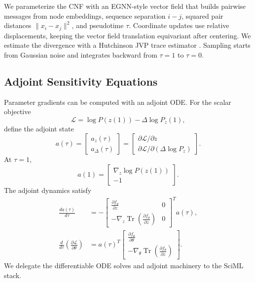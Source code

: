 \documentclass[reprint,amsmath,amssymb,aps,pra,10pt]{revtex4-2}
\begin{document}
We parameterize the CNF with an EGNN-style vector field that builds pairwise messages from node embeddings, sequence separation $i-j$, squared pair distances $\|x_i-x_j\|^2$, and pseudotime $\tau$.
Coordinate updates use relative displacements, keeping the vector field translation equivariant after centering.
We estimate the divergence with a Hutchinson JVP trace estimator \cite{hutchinson1989,grathwohl2018}.
Sampling starts from Gaussian noise and integrates backward from $\tau=1$ to $\tau=0$.

\subsection*{Adjoint Sensitivity Equations}

Parameter gradients can be computed with an adjoint ODE.
For the scalar objective
\begin{equation}
    \mathcal{L}
    =
    \log P(z(1)) - \Delta \log P_z(1),
\end{equation}
define the adjoint state
\begin{equation}
    a(\tau)
    =
    \begin{bmatrix}
        a_z(\tau) \\
        a_\Delta(\tau)
    \end{bmatrix}
    =
    \begin{bmatrix}
        \partial \mathcal{L}/\partial z \\
        \partial \mathcal{L}/\partial(\Delta \log P_z)
    \end{bmatrix}.
\end{equation}
At $\tau=1$,
\begin{equation}
    a(1)
    =
    \begin{bmatrix}
        \nabla_z \log P(z(1)) \\
        -1
    \end{bmatrix}.
\end{equation}
The adjoint dynamics satisfy
\begin{align}
    \frac{da(\tau)}{d\tau}
    &=
    -
    \begin{bmatrix}
        \frac{\partial f_\theta}{\partial z} & 0 \\
        -\nabla_z
        \operatorname{Tr}
        \left(
            \frac{\partial f_\theta}{\partial z}
        \right)
        & 0
    \end{bmatrix}^{T}
    a(\tau),
    \\
    \frac{d}{d\tau}
    \left(
        \frac{\partial \mathcal{L}}{\partial \theta}
    \right)
    &=
    a(\tau)^T
    \begin{bmatrix}
        \frac{\partial f_\theta}{\partial \theta} \\
        -\nabla_\theta
        \operatorname{Tr}
        \left(
            \frac{\partial f_\theta}{\partial z}
        \right)
    \end{bmatrix}.
\end{align}
We delegate the differentiable ODE solves and adjoint machinery to the SciML stack.
\end{document}
